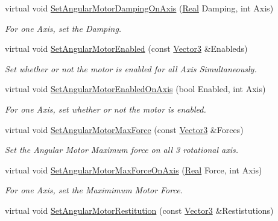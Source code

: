 \begin{DoxyCompactItemize}
virtual void \hyperlink{classMezzanine_1_1Generic6DofConstraint_a42c561134495de588cf16d7d46f1fea3}{SetAngularMotorDampingOnAxis} (\hyperlink{namespaceMezzanine_a726731b1a7df72bf3583e4a97282c6f6}{Real} Damping, int Axis)
\begin{DoxyCompactList}\small\item\em For one Axis, set the Damping. \item\end{DoxyCompactList}\item 
virtual void \hyperlink{classMezzanine_1_1Generic6DofConstraint_a9543fd9a15f9be95fafe812c90f566d8}{SetAngularMotorEnabled} (const \hyperlink{classMezzanine_1_1Vector3}{Vector3} \&Enableds)
\begin{DoxyCompactList}\small\item\em Set whether or not the motor is enabled for all Axis Simultaneously. \item\end{DoxyCompactList}\item 
virtual void \hyperlink{classMezzanine_1_1Generic6DofConstraint_af487eb94c231601a2cb3dd3e813f1024}{SetAngularMotorEnabledOnAxis} (bool Enabled, int Axis)
\begin{DoxyCompactList}\small\item\em For one Axis, set whether or not the motor is enabled. \item\end{DoxyCompactList}\item 
virtual void \hyperlink{classMezzanine_1_1Generic6DofConstraint_ada0b7be3499cb3da27ca36e0076323c7}{SetAngularMotorMaxForce} (const \hyperlink{classMezzanine_1_1Vector3}{Vector3} \&Forces)
\begin{DoxyCompactList}\small\item\em Set the Angular Motor Maximum force on all 3 rotational axis. \item\end{DoxyCompactList}\item 
virtual void \hyperlink{classMezzanine_1_1Generic6DofConstraint_ae4909e7a8782698049a06036b1a044c2}{SetAngularMotorMaxForceOnAxis} (\hyperlink{namespaceMezzanine_a726731b1a7df72bf3583e4a97282c6f6}{Real} Force, int Axis)
\begin{DoxyCompactList}\small\item\em For one Axis, set the Maximimum Motor Force. \item\end{DoxyCompactList}\item 
virtual void \hyperlink{classMezzanine_1_1Generic6DofConstraint_adbd65a2c6facda66b4736baa24fd12ed}{SetAngularMotorRestitution} (const \hyperlink{classMezzanine_1_1Vector3}{Vector3} \&Restistutions)

\end{DoxyCompactItemize}

